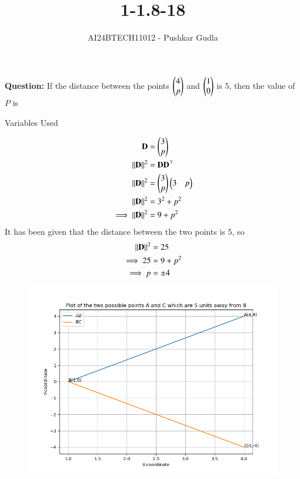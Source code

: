 \documentclass[journal]{IEEEtran}
\begin{document}

\vspace{3cm}

\title{1-1.8-18}
\author{AI24BTECH11012 - Pushkar Gudla}
{\let\newpage\relax\maketitle}

\renewcommand{\thefigure}{\theenumi}
\renewcommand{\thetable}{\theenumi}
\setlength{\intextsep}{10pt} %


\renewcommand{\thetable}{\theenumi}
\textbf{Question:} If the distance between the points $\begin{pmatrix}4\\p\end{pmatrix}$ and $\begin{pmatrix}1\\0\end{pmatrix}$ is $5$, then the value of $P$ is
\solution
\begin{table}[h!]    
  \centering
  
  \caption{Variables Used}
  \label{tab 1.8.18}
\end{table}
\begin{align}
	\mathbf{D}	&= \begin{pmatrix}3\\p\end{pmatrix} \\
	\left\lVert\mathbf{D}\right\rVert^2 &= \mathbf{D}\mathbf{D}^\top \\
	\left\lVert\mathbf{D}\right\rVert^2 &= \begin{pmatrix}3\\p\end{pmatrix}\begin{pmatrix}3 & p\end{pmatrix} \\
	\left\lVert\mathbf{D}\right\rVert^2 &= 3^2 + p^2 \\
	\implies \left\lVert\mathbf{D}\right\rVert^2 &= 9 + p^2
\end{align}
It has been given that the distance between the two points is $5$, so \\
\begin{align}
	\left\lVert\mathbf{D}\right\rVert^2 &= 25 \\
	\implies 25 &= 9 + p^2 \\
	\implies p &= \pm 4
\end{align}
\begin{figure}[h]
	\centering
	\includegraphics[scale=0.6]{figs/plot.png}
	\label{Fig}
\end{figure}
\end{document}
